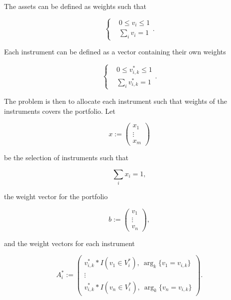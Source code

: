 \documentclass{article}
\begin{document}
\noindent The assets can be defined as weights such that 

\begin{equation}
    \begin{cases}
        & 0 \leq v_i \leq 1 \\
        & \sum_i v_i = 1
    \end{cases}.
\end{equation}

\noindent Each instrument can be defined as a vector containing their own weights

\begin{equation}
    \begin{cases}
        & 0 \leq v^*_{i,k} \leq 1 \\
        & \sum_i v^*_{i,k} = 1
    \end{cases}.
\end{equation}

\noindent The problem is then to allocate each instrument such that weights of the instruments covers the portfolio. Let

\begin{equation}
    x := 
    \begin{pmatrix}
        x_1 \\
        \vdots \\
        x_m
    \end{pmatrix}
\end{equation}

\noindent be the selection of instruments such that 

\begin{equation}
    \sum_i x_i = 1,
\end{equation}

\noindent the weight vector for the portfolio

\begin{equation}
    b := 
    \begin{pmatrix}
        v_1 \\
        \vdots \\
        v_n
    \end{pmatrix},
\end{equation}

\noindent and the weight vectors for each instrument

\begin{equation}
    A^*_i := 
    \begin{pmatrix}
        v^*_{i,k} * I(v_1 \in V^*_i), ~ \arg_k \{ v_1 = v_{i,k} \}  \\
        \vdots \\
        v^*_{i,k} * I(v_n \in V^*_i), ~ \arg_k \{ v_n = v_{i,k} \}
    \end{pmatrix}.
\end{equation}
\end{document}
